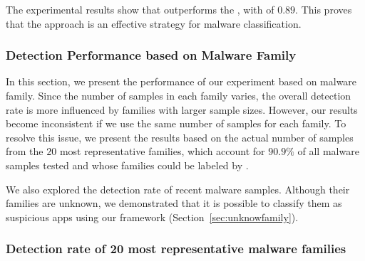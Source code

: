 \begin{finding}
  The experimental results show that \droidxpflow outperforms the \mas, with \fone of $0.89$. This proves that the
  approach is an effective strategy for malware classification.
\end{finding}


\begin{table}
  \caption{Accuracy of both strategy on \fds (1220 samples).}
  \label{tab:accuracy}
\end{table}




\subsubsection{Detection Performance based on Malware Family}\label{sec:family-assessment}

In this section, we present the performance of our experiment based on malware family. Since the number of samples in each family varies, the overall detection rate is more influenced by families with larger sample sizes. However, our results become inconsistent if we use the same number of samples for each family. To resolve this issue, we present the results based on the actual number of samples from the $20$ most representative families, which account for $90.9\%$ of all malware samples tested and whose families could be labeled by \vt.

We also explored the detection rate of recent malware samples. Although their families are unknown, we demonstrated that it is possible to classify them as suspicious apps using our framework (Section~\ref{sec:unknowfamily}).


\subsubsection{Detection rate of 20 most representative malware families}\label{sec:familyDetection}


